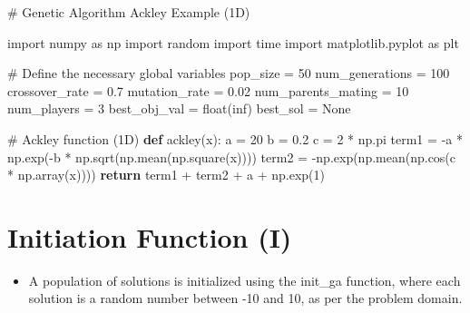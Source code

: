 \documentclass[
  letterpaper,
  DIV=11,
  numbers=noendperiod]{scrreprt}
\newenvironment{Shaded}{\begin{snugshade}}{\end{snugshade}}
\newcommand{\BuiltInTok}[1]{\textcolor[rgb]{0.00,0.23,0.31}{#1}}
\newcommand{\CommentTok}[1]{\textcolor[rgb]{0.37,0.37,0.37}{#1}}
\newcommand{\ControlFlowTok}[1]{\textcolor[rgb]{0.00,0.23,0.31}{\textbf{#1}}}
\newcommand{\DecValTok}[1]{\textcolor[rgb]{0.68,0.00,0.00}{#1}}
\newcommand{\FloatTok}[1]{\textcolor[rgb]{0.68,0.00,0.00}{#1}}
\newcommand{\ImportTok}[1]{\textcolor[rgb]{0.00,0.46,0.62}{#1}}
\newcommand{\KeywordTok}[1]{\textcolor[rgb]{0.00,0.23,0.31}{\textbf{#1}}}
\newcommand{\NormalTok}[1]{\textcolor[rgb]{0.00,0.23,0.31}{#1}}
\newcommand{\OperatorTok}[1]{\textcolor[rgb]{0.37,0.37,0.37}{#1}}
\newcommand{\StringTok}[1]{\textcolor[rgb]{0.13,0.47,0.30}{#1}}
\newcommand{\VariableTok}[1]{\textcolor[rgb]{0.07,0.07,0.07}{#1}}
\providecommand{\tightlist}{%
  \setlength{\itemsep}{0pt}\setlength{\parskip}{0pt}}\usepackage{longtable,booktabs,array}
\begin{document}
\begin{Shaded}
\begin{Highlighting}[]
\CommentTok{\# Genetic Algorithm Ackley Example (1D)}

\ImportTok{import}\NormalTok{ numpy }\ImportTok{as}\NormalTok{ np}
\ImportTok{import}\NormalTok{ random}
\ImportTok{import}\NormalTok{ time}
\ImportTok{import}\NormalTok{ matplotlib.pyplot }\ImportTok{as}\NormalTok{ plt}

\CommentTok{\# Define the necessary global variables}
\NormalTok{pop\_size }\OperatorTok{=} \DecValTok{50}
\NormalTok{num\_generations }\OperatorTok{=} \DecValTok{100}
\NormalTok{crossover\_rate }\OperatorTok{=} \FloatTok{0.7}
\NormalTok{mutation\_rate }\OperatorTok{=} \FloatTok{0.02}
\NormalTok{num\_parents\_mating }\OperatorTok{=} \DecValTok{10}
\NormalTok{num\_players }\OperatorTok{=} \DecValTok{3}
\NormalTok{best\_obj\_val }\OperatorTok{=} \BuiltInTok{float}\NormalTok{(}\StringTok{\textquotesingle{}inf\textquotesingle{}}\NormalTok{)}
\NormalTok{best\_sol }\OperatorTok{=} \VariableTok{None}

\CommentTok{\# Ackley function (1D)}
\KeywordTok{def}\NormalTok{ ackley(x):}
\NormalTok{    a }\OperatorTok{=} \DecValTok{20}
\NormalTok{    b }\OperatorTok{=} \FloatTok{0.2}
\NormalTok{    c }\OperatorTok{=} \DecValTok{2} \OperatorTok{*}\NormalTok{ np.pi}
\NormalTok{    term1 }\OperatorTok{=} \OperatorTok{{-}}\NormalTok{a }\OperatorTok{*}\NormalTok{ np.exp(}\OperatorTok{{-}}\NormalTok{b }\OperatorTok{*}\NormalTok{ np.sqrt(np.mean(np.square(x))))}
\NormalTok{    term2 }\OperatorTok{=} \OperatorTok{{-}}\NormalTok{np.exp(np.mean(np.cos(c }\OperatorTok{*}\NormalTok{ np.array(x))))}
    \ControlFlowTok{return}\NormalTok{ term1 }\OperatorTok{+}\NormalTok{ term2 }\OperatorTok{+}\NormalTok{ a }\OperatorTok{+}\NormalTok{ np.exp(}\DecValTok{1}\NormalTok{)}
\end{Highlighting}
\end{Shaded}

\section{Initiation Function (I)}\label{initiation-function-i}

\begin{itemize}
\tightlist
\item
  A population of solutions is initialized using the init\_ga function,
  where each solution is a random number between -10 and 10, as per the
  problem domain.
\end{itemize}
\end{document}
